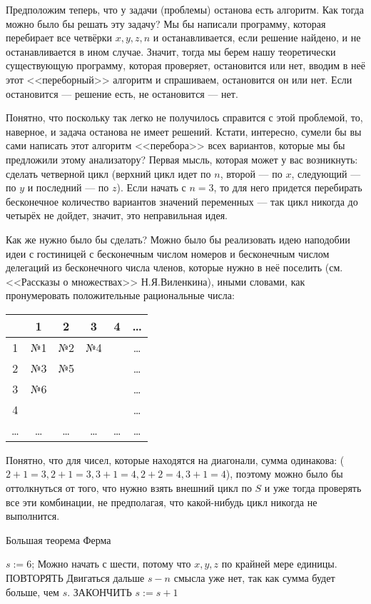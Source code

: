 \documentclass[russian]{lecture-notes}
\begin{document}
	Предположим теперь, что у задачи (проблемы) останова есть алгоритм. Как тогда можно было бы решать эту задачу? Мы бы написали программу, которая перебирает все четвёрки $x, y, z, n$ и останавливается, если решение найдено, и не останавливается в ином случае. Значит, тогда мы берем нашу теоретически существующую программу, которая проверяет, остановится или нет, вводим в неё этот <<переборный>> алгоритм и спрашиваем, остановится он или нет. Если остановится --- решение есть, не остановится --- нет. 
	
	Понятно, что поскольку так легко не получилось справится с этой проблемой, то, наверное, и задача останова не имеет решений. Кстати, интересно, сумели бы вы сами написать этот алгоритм <<перебора>> всех вариантов, которые мы бы предложили этому анализатору? Первая мысль, которая может у вас возникнуть: сделать четверной цикл (верхний цикл идет по $n$, второй --- по $x$, следующий --- по $y$ и последний --- по $z$). Если начать с $n = 3$, то для него придется перебирать бесконечное количество вариантов значений переменных --- так цикл никогда до четырёх не дойдет, значит, это неправильная идея. 
	
	Как же нужно было бы сделать? Можно было бы реализовать идею наподобии идеи с гостиницей с бесконечным числом номеров и бесконечным числом делегаций из бесконечного числа членов, которые нужно в неё поселить (см. <<Рассказы о множествах>> Н.Я.Виленкина), иными словами, как пронумеровать положительные рациональные числа:
	
	\begin{tabular}{c|c|c|c|c|c}
		& 1 & 2 & 3 & 4 & \ldots \\
		\hline 1 & №1 & №2 & №4 &  &  \ldots \\\hline
		2 & №3 & №5 &  &  &  \ldots \\\hline
		3 & №6 &  &  &  &  \ldots \\\hline
		4 &  &  &  &  &  \ldots \\\hline
		\ldots & \ldots & \ldots & \ldots & \ldots & \ldots
	\end{tabular}
	
	Понятно, что для чисел, которые находятся на диагонали, сумма одинакова: ($2 + 1 = 3, 2 + 1 = 3, 3 + 1 = 4, 2 + 2 = 4, 3 + 1 = 4$), поэтому можно было бы оттолкнуться от того, что нужно взять внешний цикл по $S$ и уже тогда проверять все эти комбинации, не предполагая, что какой-нибудь цикл никогда не выполнится.
	
	
	\begin{algorithm}[H]
		\caption{Большая теорема Ферма}
		\label{alg:one}
		\begin{algorithmic}
			\State $s := 6$; 
			\Comment Можно начать с шести, потому что $x, y, z$ по крайней мере единицы.
			\State ПОВТОРЯТЬ
			\Comment Двигаться дальше $s - n$ смысла уже нет, так как сумма будет больше, чем $s$.
			\State ЗАКОНЧИТЬ
			\Else
			\State $s := s + 1$
			\EndIf
			\EndFor
			\EndFor
			\EndFor
			\EndFor
		\end{algorithmic}
	\end{algorithm}
	
\end{document}

